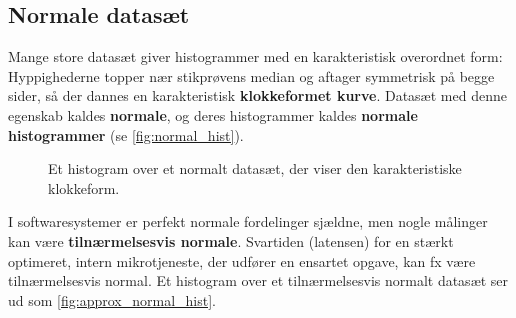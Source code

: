\subsection*{Normale datasæt}

Mange store datasæt giver histogrammer med en karakteristisk overordnet form: Hyppighederne topper nær stikprøvens median og aftager symmetrisk på begge sider, så der dannes en karakteristisk \textbf{klokkeformet kurve}. Datasæt med denne egenskab kaldes \textbf{normale}, og deres histogrammer kaldes \textbf{normale histogrammer} (se \autoref{fig:normal_hist}).

\begin{figure}[htbp]
    \centering
    \caption{Et histogram over et normalt datasæt, der viser den karakteristiske klokkeform.}
    \label{fig:normal_hist}
\end{figure}


I softwaresystemer er perfekt normale fordelinger sjældne, men nogle målinger kan være \textbf{tilnærmelsesvis normale}. Svartiden (latensen) for en stærkt optimeret, intern mikrotjeneste, der udfører en ensartet opgave, kan fx være tilnærmelsesvis normal. Et histogram over et tilnærmelsesvis normalt datasæt ser ud som \autoref{fig:approx_normal_hist}.

